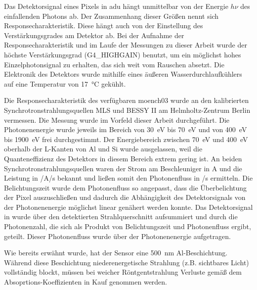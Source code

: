 \noindent
Das Detektorsignal eines Pixels in \gls{adu} hängt unmittelbar von der Energie $h\nu$ des einfallenden Photons ab. Der Zusammenhang dieser Größen nennt sich Responsecharakteristik. Diese hängt auch von der Einstellung des Verstärkungsgrades am Detektor ab. Bei der Aufnahme der Responsecharakteristik und im Laufe der Messungen zu dieser Arbeit wurde der höchste Verstärkungsgrad (G4\_HIGHGAIN) benutzt, um ein möglichst hohes Einzelphotonsignal zu erhalten, das sich weit vom Rauschen absetzt. Die Elektronik des Detektors wurde mithilfe eines äußeren Wasserdurchlaufkühlers auf eine Temperatur von \SI{17}{\celsius} gekühlt. 
%     

\noindent
Die Responsecharakteristik des verfügbaren \gls{moench03} wurde an den kalibrierten Synchrotronstrahlungsquellen MLS und BESSY II am Helmholtz-Zentrum Berlin vermessen. Die Messung wurde im Vorfeld dieser Arbeit durchgeführt. Die Photonenenergie wurde jeweils im Bereich von \SI{30}{\eV} bis \SI{70}{\eV} und von \SI{400}{\eV} bis \SI{1900}{\eV} frei durchgestimmt. Der Energiebereich zwischen \SI{70}{\eV} und \SI{400}{\eV} oberhalb der L-Kanten von Al und Si wurde ausgelassen, weil die Quanteneffizienz des Detektors in diesem Bereich extrem gering ist. An beiden Synchrotronstrahlungsquellen waren der Strom am Beschleuniger in \si{\ampere} und die Leistung in \si[per-mode = symbol]{\photons\per\ampere\per\second} bekannt und ließen somit den Photonenfluss in \si[per-mode = symbol]{\photons\per\second} ermitteln. Die Belichtungszeit wurde dem Photonenfluss so angepasst, dass die Überbelichtung der Pixel auszuschließen und dadurch die Abhängigkeit des Detektorsignals von der Photonenenergie möglichst linear genähert werden konnte. Das Detektorsignal in \si{\adu} wurde über den detektierten Strahlquerschnitt aufsummiert und durch die Photonenzahl, die sich als Produkt von Belichtungszeit und Photonenfluss ergibt, geteilt. Dieser Photonenfluss wurde über der Photonenenergie aufgetragen.

\noindent
Wie bereits erwähnt wurde, hat der Sensor eine \SI{500}{\nano\meter} Al-Beschichtung. Während diese Beschichtung niederenergetische Strahlung (z.B. sichtbares Licht) vollständig blockt, müssen bei weicher Röntgentstrahlung Verluste gemäß dem Absoprtions-Koeffizienten in Kauf genommen werden.

